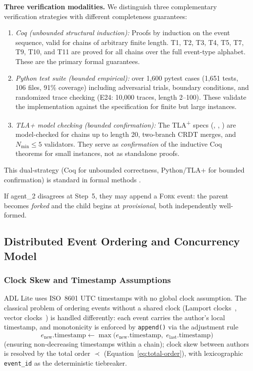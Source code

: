 \textbf{Three verification modalities.} We distinguish three complementary verification strategies with different completeness guarantees:
\begin{enumerate}[label=(\roman*)]
    \item \emph{Coq (unbounded structural induction):} Proofs by induction on the event sequence, valid for chains of arbitrary finite length. T1, T2, T3, T4, T5, T7, T9, T10, and T11 are proved for all chains over the full event-type alphabet. These are the primary formal guarantees.
    \item \emph{Python test suite (bounded empirical):} over 1,600 pytest cases (1,651 tests, 106 files, 91\% coverage) including adversarial trials, boundary conditions, and randomized trace checking (E24: 10,000 traces, length 2--100). These validate the implementation against the specification for finite but large instances.
    \item \emph{TLA+ model checking (bounded confirmation):} The TLA\textsuperscript{+} specs (, , ) are model-checked for chains up to length 20, two-branch CRDT merges, and $N_{\min} \leq 5$ validators. They serve as \emph{confirmation} of the inductive Coq theorems for small instances, not as standalone proofs.
\end{enumerate}
This dual-strategy (Coq for unbounded correctness, Python/TLA+ for bounded confirmation) is standard in formal methods \cite{lamport2002specifying,coq_reference}.

If agent\_2 disagrees at Step~5, they may append a \textsc{Fork} event: the parent becomes \textit{forked} and the child begins at \textit{provisional}, both independently well-formed.

\subsection{Distributed Event Ordering and Concurrency Model}\label{subsec:distributed-ordering}

\subsubsection{Clock Skew and Timestamp Assumptions}

ADL Lite uses ISO~8601 UTC timestamps with no global clock assumption. The classical problem of ordering events without a shared clock (Lamport clocks~\cite{lamport_clocks}, vector clocks~\cite{vector_clocks}) is handled differently: each event carries the author's local timestamp, and monotonicity is enforced by \texttt{append()} via the adjustment rule
\begin{equation}\label{eq:timestamp-adjust}
    e_{\text{new}}.\text{timestamp} \gets \max\bigl(e_{\text{new}}.\text{timestamp},\; e_{\text{last}}.\text{timestamp}\bigr)
\end{equation}
(ensuring non-decreasing timestamps within a chain); clock skew between authors is resolved by the total order $\prec$ (Equation~\ref{eq:total-order}), with lexicographic \texttt{event\_id} as the deterministic tiebreaker.

